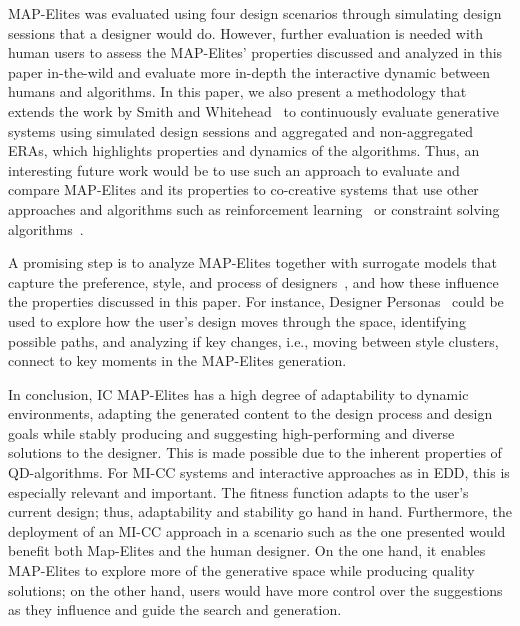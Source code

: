 MAP-Elites was evaluated using four design scenarios through simulating design sessions that a designer would do. However, further evaluation is needed with human users to assess the MAP-Elites' properties discussed and analyzed in this paper in-the-wild and evaluate more in-depth the interactive dynamic between humans and algorithms. In this paper, we also present a methodology that extends the work by Smith and Whitehead~\cite{Smith:2010:Expressive-range} to continuously evaluate generative systems using simulated design sessions and aggregated and non-aggregated ERAs, which highlights properties and dynamics of the algorithms. Thus, an interesting future work would be to use such an approach to evaluate and compare MAP-Elites and its properties to co-creative systems that use other approaches and algorithms such as reinforcement learning~\cite{delarosa2020-RLbrushMixedinit,guzdial-lvldsg-aiide-2018} or constraint solving algorithms~\cite{Karth2019-pcgmlDiscriminativeLearning}.



A promising step is to analyze MAP-Elites together with surrogate models that capture the preference, style, and process of designers~\cite{Liapis2013-designerModel,Alvarez2020-DesignerPreference,alvarez2020-designerpersonas}, and how these influence the properties discussed in this paper. For instance, Designer Personas~\cite{alvarez2020-designerpersonas} could be used to explore how the user's design moves through the space, identifying possible paths, and analyzing if key changes, i.e., moving between style clusters, connect to key moments in the MAP-Elites generation.

In conclusion, IC MAP-Elites has a high degree of adaptability to dynamic environments, adapting the generated content to the design process and design goals while stably producing and suggesting high-performing and diverse solutions to the designer. This is made possible due to the inherent properties of QD-algorithms. For MI-CC systems and interactive approaches as in EDD, this is especially relevant and important. The fitness function adapts to the user's current design; thus, adaptability and stability go hand in hand. Furthermore, the deployment of an MI-CC approach in a scenario such as the one presented would benefit both Map-Elites and the human designer. On the one hand, it enables MAP-Elites to explore more of the generative space while producing quality solutions; on the other hand, users would have more control over the suggestions as they influence and guide the search and generation.


